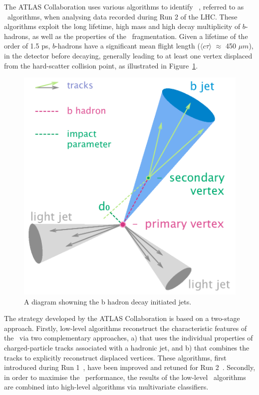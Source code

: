 

The ATLAS Collaboration uses various algorithms to identify 
\bjets~\cite{PERF-2012-04}, referred to as \btagging\ algorithms, 
when analysing data recorded during Run 2 of the LHC. These 
algorithms exploit the long lifetime, high mass and high decay 
multiplicity of $b$-hadrons, as well as the properties of the \bquark\  
fragmentation. Given a lifetime of the order of 1.5 ps, $b$-hadrons have a 
significant mean flight length ($\langle c\tau \rangle$ $\approx$ 450 $\mu m$), 
in the detector before decaying, generally leading to at least one vertex 
displaced from the hard-scatter collision point, as illustrated in Figure~\ref{fig:b-jet-decay}.

\begin{figure}[bth]
	\begin{centering}	
	\includegraphics[width=.6\textwidth]{FTAG_plots/B-tagging_diagram.png}
	\caption{A diagram showning the b hadron decay initiated jets. }
	\label{fig:b-jet-decay}
	\end{centering}
\end{figure}


The strategy developed by the ATLAS Collaboration is based on a two-stage approach. 
Firstly, low-level algorithms reconstruct the characteristic features of 
the \bjets\ via two complementary approaches, a) that uses the 
individual properties of charged-particle tracks
associated with a hadronic jet, and b) that 
combines the tracks to explicitly reconstruct displaced vertices. 
These algorithms, first introduced during Run 1~\cite{PERF-2012-04}, 
have been improved and retuned for Run 2~\cite{FTAG-2018-01}. 
Secondly, in order to 
maximise the \btagging\ performance, the results of the low-level 
\btagging\ algorithms are combined into high-level algorithms 
via multivariate classifiers. 



